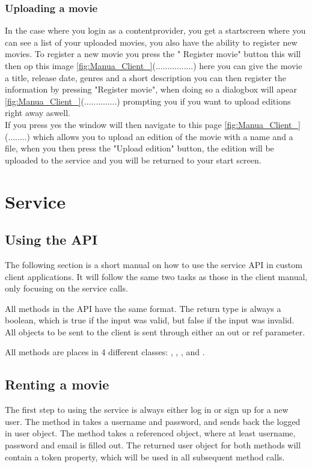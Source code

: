 \subsubsection{Uploading a movie}
\label{Manual_Client_Navigation_Upload}
In the case where you login as a contentprovider, you get a startscreen where you can see a list of your uploaded movies, you also have the ability to register new movies. To register a new movie you press the " Register movie" button this will then op this image \ref{fig:Manua_Client_}(................) here you can give the movie a title,  release date, genres and a short description you can then register the information by pressing "Register movie", when doing so a dialogbox will apear \ref{fig:Manua_Client_}(..............) prompting you if you want to upload editions right away aswell.
\\If you press yes the window will then navigate to this page \ref{fig:Manua_Client_}(........) which allows you to upload an edition of the movie with a name and a file, when you then press the "Upload edition" button, the edition will be uploaded to the service and you will be returned to your start screen.

\section{Service}
\label{Manual_Service}

\subsection{Using the API}
\label{Manual_Service_Usage}
The following section is a short manual on how to use the service API in custom client applications. It will follow the same two tasks as those in the client manual, only focusing on the service calls.

All methods in the API have the same format. The return type is always a boolean, which is true if the input was valid, but false if the input was invalid. All objects to be sent to the client is sent through either an out or ref parameter.

All methods are places in 4 different classes: , , , and .

\subsection{Renting a movie}
\label{Manual_Service_Usage_Rent}
The first step to using the service is always either log in or sign up for a new user. The  method in  takes a username and password, and sends back the logged in user object. The  method takes a referenced  object, where at least username, password and email is filled out. The returned user object for both methods will contain a token property, which will be used in all subsequent method calls.

